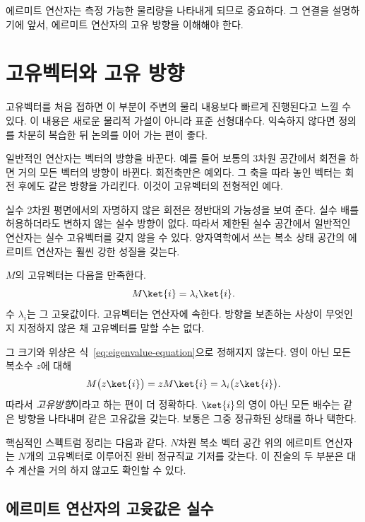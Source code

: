 에르미트 연산자는 측정 가능한 물리량을 나타내게 되므로 중요하다. 그 연결을 설명하기에 앞서, 에르미트 연산자의 고유 방향을 이해해야 한다.

\section{고유벡터와 고유 방향}

고유벡터를 처음 접하면 이 부분이 주변의 물리 내용보다 빠르게 진행된다고 느낄 수 있다. 이 내용은 새로운 물리적 가설이 아니라 표준 선형대수다. 익숙하지 않다면 정의를 차분히 복습한 뒤 논의를 이어 가는 편이 좋다.

일반적인 연산자는 벡터의 방향을 바꾼다. 예를 들어 보통의 3차원 공간에서 회전을 하면 거의 모든 벡터의 방향이 바뀐다. 회전축만은 예외다. 그 축을 따라 놓인 벡터는 회전 후에도 같은 방향을 가리킨다. 이것이 고유벡터의 전형적인 예다.

실수 2차원 평면에서의 자명하지 않은 회전은 정반대의 가능성을 보여 준다. 실수 배를 허용하더라도 변하지 않는 실수 방향이 없다. 따라서 제한된 실수 공간에서 일반적인 연산자는 실수 고유벡터를 갖지 않을 수 있다. 양자역학에서 쓰는 복소 상태 공간의 에르미트 연산자는 훨씬 강한 성질을 갖는다.

\(M\)의 고유벡터는 다음을 만족한다.
\begin{equation}
M\ket{i}=\lambda_i\ket{i}.
\label{eq:eigenvalue-equation}
\end{equation}
수 \(\lambda_i\)는 그 고윳값이다. 고유벡터는 연산자에 속한다. 방향을 보존하는 사상이 무엇인지 지정하지 않은 채 고유벡터를 말할 수는 없다.

그 크기와 위상은 식~\eqref{eq:eigenvalue-equation}으로 정해지지 않는다. 영이 아닌 모든 복소수 \(z\)에 대해
\[
M\bigl(z\ket{i}\bigr)
=zM\ket{i}
=\lambda_i\bigl(z\ket{i}\bigr).
\]
따라서 \emph{고유방향}이라고 하는 편이 더 정확하다. \(\ket{i}\)의 영이 아닌 모든 배수는 같은 방향을 나타내며 같은 고유값을 갖는다. 보통은 그중 정규화된 상태를 하나 택한다.

핵심적인 스펙트럼 정리는 다음과 같다. \(N\)차원 복소 벡터 공간 위의 에르미트 연산자는 \(N\)개의 고유벡터로 이루어진 완비 정규직교 기저를 갖는다. 이 진술의 두 부분은 대수 계산을 거의 하지 않고도 확인할 수 있다.

\subsection{에르미트 연산자의 고윳값은 실수}

